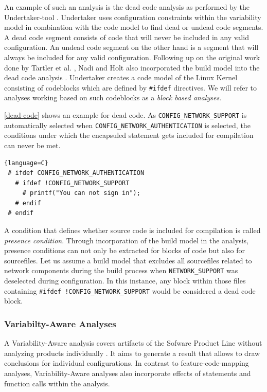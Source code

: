 \documentclass[a4paper]{article}
\begin{document}
An example of such an analysis is the dead code analysis as performed by the Undertaker-tool \cite{Tartler:2011:FCC:1966445.1966451}. Undertaker uses configuration constraints within the variability model in combination with the code model to find dead or undead code segments. A dead code segment consists of code that will never be included in any valid configuration. An undead code segment on the other hand is a segment that will always be included for any valid configuration. Following up on the original work done by  Tartler et al. \cite{Tartler:2011:FCC:1966445.1966451}, Nadi and Holt also incorporated the build model into the dead code analysis \cite{mining-kbuild}. Undertaker creates a code model of the Linux Kernel consisting of codeblocks which are defined by \texttt{\#ifdef} directives. We will refer to analyses working based on such codeblocks as a \emph{block based analyses}.

\autoref{dead-code} shows an example for dead code. As \texttt{CONFIG\_NETWORK\_SUPPORT} is automatically selected when \texttt{CONFIG\_NETWORK\_AUTHENTICATION} is selected, the conditions under which the encapsuled statement gets included for compilation can never be met. 

\begin{lstlisting}[caption=Dead Code, label=dead-code]{language=C}
 # ifdef CONFIG_NETWORK_AUTHENTICATION
   # ifdef !CONFIG_NETWORK_SUPPORT
     # printf("You can not sign in");
   # endif
 # endif
\end{lstlisting}

A condition that defines whether source code is included for compilation is called \emph{presence condition}. Through incorporation of the build model in the analysis, presence conditions can not only be extracted for blocks of code but also for sourcefiles. Let us assume a build model that excludes all sourcefiles related to network components during the build process when \texttt{NETWORK\_SUPPORT} was deselected during configuration. In this instance, any block within those files containing \texttt{\#ifdef !CONFIG\_NETWORK\_SUPPORT} would be considered a dead code block.

\subsubsection{Variabilty-Aware Analyses}

A Variability-Aware analysis covers artifacts of the Sofware Product Line without analyzing products individually \cite[p.261]{Apel:2013:FSP:2541773}. It aims to generate a result that allows to draw conclusions for individual configurations. In contrast to feature-code-mapping analyses, Variability-Aware analyses also incorporate effects of statements and function calls within the analysis.
\end{document}
